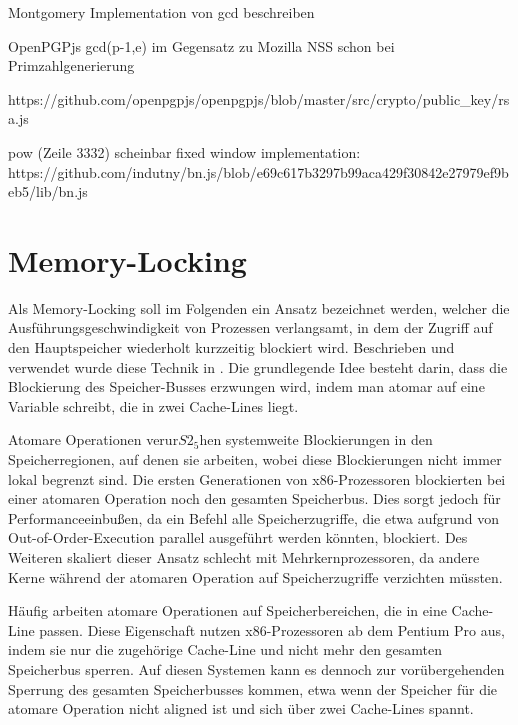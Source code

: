 Montgomery Implementation von gcd beschreiben

OpenPGPjs gcd(p-1,e) im Gegensatz zu Mozilla NSS schon bei Primzahlgenerierung

https://github.com/openpgpjs/openpgpjs/blob/master/src/crypto/public_key/rsa.js

pow (Zeile 3332) scheinbar fixed window implementation:\\
https://github.com/indutny/bn.js/blob/e69c617b3297b99aca429f30842e27979ef9beb5/lib/bn.js

\section{Memory-Locking}
\label{MemoryLocking}

Als Memory-Locking soll im Folgenden ein Ansatz bezeichnet werden, welcher die Ausführungsgeschwindigkeit von Prozessen verlangsamt, in dem der Zugriff auf den Hauptspeicher wiederholt kurzzeitig blockiert wird.
Beschrieben und verwendet wurde diese Technik in \cite{MemoryLockingWu, MemoryLockingRisenpart, MemoryLockingJavaAndroid}.
Die grundlegende Idee besteht darin, dass die Blockierung des Speicher-Busses erzwungen wird, indem man atomar auf eine Variable schreibt, die in zwei Cache-Lines liegt.

Atomare Operationen verur$S2_5$hen systemweite Blockierungen in den Speicherregionen, auf denen sie arbeiten, wobei diese Blockierungen nicht immer lokal begrenzt sind.
Die ersten Generationen von x86-Prozessoren blockierten bei einer atomaren Operation noch den gesamten Speicherbus.
Dies sorgt jedoch für Performanceeinbußen, da ein Befehl alle Speicherzugriffe, die etwa aufgrund von Out-of-Order-Execution parallel ausgeführt werden könnten, blockiert.
Des Weiteren skaliert dieser Ansatz schlecht mit Mehrkernprozessoren, da andere Kerne während der atomaren Operation auf Speicherzugriffe verzichten müssten.

Häufig arbeiten atomare Operationen auf Speicherbereichen, die in eine Cache-Line passen. Diese Eigenschaft nutzen x86-Prozessoren ab dem Pentium Pro aus, indem sie nur die zugehörige Cache-Line und nicht mehr den gesamten Speicherbus sperren.
Auf diesen Systemen kann es dennoch zur vorübergehenden Sperrung des gesamten Speicherbusses kommen, etwa wenn der Speicher für die atomare Operation nicht 
aligned %
ist und sich über zwei Cache-Lines spannt.

